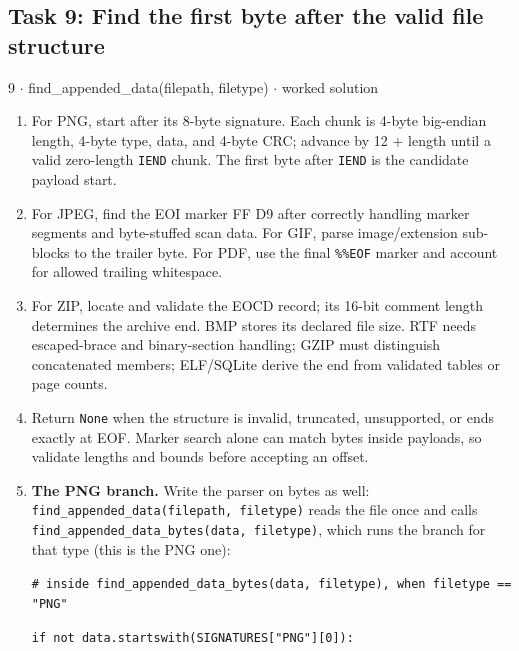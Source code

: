 \documentclass[11pt]{article}
\begin{document}
\begin{keepsection}\subsection{Task 9: Find the first byte after the valid file structure}

\begin{workedbox}{9 \ensuremath{\cdot} find\_appended\_data(filepath, filetype) \ensuremath{\cdot} worked solution}
\begin{enumerate}
\item For PNG, start after its 8-byte signature. Each chunk is 4-byte big-endian length, 4-byte type, data, and 4-byte CRC; advance by 12 + length until a valid zero-length \texttt{IEND} chunk. The first byte after \texttt{IEND} is the candidate payload start.
\item For JPEG, find the EOI marker FF D9 after correctly handling marker segments and byte-stuffed scan data. For GIF, parse image/extension sub-blocks to the trailer byte. For PDF, use the final \texttt{\%\%EOF} marker and account for allowed trailing whitespace.
\item For ZIP, locate and validate the EOCD record; its 16-bit comment length determines the archive end. BMP stores its declared file size. RTF needs escaped-brace and binary-section handling; GZIP must distinguish concatenated members; ELF/SQLite derive the end from validated tables or page counts.
\item Return \texttt{None} when the structure is invalid, truncated, unsupported, or ends exactly at EOF. Marker search alone can match bytes inside payloads, so validate lengths and bounds before accepting an offset.
\item {}
\textbf{The PNG branch.} Write the parser on bytes as well: \texttt{find\_appended\_data(filepath, filetype)} reads the file once and calls \texttt{find\_appended\_data\_bytes(data, filetype)}, which runs the branch for that type (this is the PNG one):
\begin{tcolorbox}[colback=Paperblue,colframe=Paperblue,boxrule=0pt,arc=0pt,left=7pt,right=7pt,top=5pt,bottom=5pt]\small\sloppy
\noindent\hspace*{0em}\texttt{\# inside find\_appended\_data\_bytes(data, filetype), when filetype == "PNG"}\par
\noindent\hspace*{0em}\texttt{if not data.startswith(SIGNATURES["PNG"][0]):}\par

\end{tcolorbox}
\end{enumerate}
\end{workedbox}
\end{keepsection}
\end{document}
